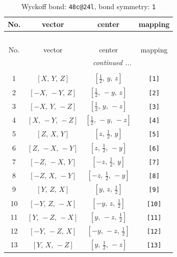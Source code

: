 \documentclass[fleqn,8pt]{jsarticle}
\begin{document}
\begin{longtable}{cccc}
\caption{Wyckoff bond: {\tt 48c@24l}, bond symmetry: {\tt 1}}
 \\
 \hline \hline
No. & vector & center & mapping \\ \hline \endfirsthead

\multicolumn{3}{l}{\tablename\ \thetable{}} \\
 \hline \hline
No. & vector & center & mapping \\ \hline \endhead

 \hline \hline
\multicolumn{3}{r}{\footnotesize\it continued ...} \\ \endfoot

 \hline \hline
\multicolumn{3}{r}{} \\ \endlastfoot

1 & $\left[ X,\, Y,\, Z \right]$ & $\left[ \frac{1}{2},\, y,\, z \right]$ & {\tt [1]} \\ \hline
2 & $\left[ - X,\, - Y,\, Z \right]$ & $\left[ \frac{1}{2},\, - y,\, z \right]$ & {\tt [2]} \\ \hline
3 & $\left[ - X,\, Y,\, - Z \right]$ & $\left[ \frac{1}{2},\, y,\, - z \right]$ & {\tt [3]} \\ \hline
4 & $\left[ X,\, - Y,\, - Z \right]$ & $\left[ \frac{1}{2},\, - y,\, - z \right]$ & {\tt [4]} \\ \hline
5 & $\left[ Z,\, X,\, Y \right]$ & $\left[ z,\, \frac{1}{2},\, y \right]$ & {\tt [5]} \\ \hline
6 & $\left[ Z,\, - X,\, - Y \right]$ & $\left[ z,\, \frac{1}{2},\, - y \right]$ & {\tt [6]} \\ \hline
7 & $\left[ - Z,\, - X,\, Y \right]$ & $\left[ - z,\, \frac{1}{2},\, y \right]$ & {\tt [7]} \\ \hline
8 & $\left[ - Z,\, X,\, - Y \right]$ & $\left[ - z,\, \frac{1}{2},\, - y \right]$ & {\tt [8]} \\ \hline
9 & $\left[ Y,\, Z,\, X \right]$ & $\left[ y,\, z,\, \frac{1}{2} \right]$ & {\tt [9]} \\ \hline
10 & $\left[ - Y,\, Z,\, - X \right]$ & $\left[ - y,\, z,\, \frac{1}{2} \right]$ & {\tt [10]} \\ \hline
11 & $\left[ Y,\, - Z,\, - X \right]$ & $\left[ y,\, - z,\, \frac{1}{2} \right]$ & {\tt [11]} \\ \hline
12 & $\left[ - Y,\, - Z,\, X \right]$ & $\left[ - y,\, - z,\, \frac{1}{2} \right]$ & {\tt [12]} \\ \hline
13 & $\left[ Y,\, X,\, - Z \right]$ & $\left[ y,\, \frac{1}{2},\, - z \right]$ & {\tt [13]} \\ \hline

\end{longtable}
\end{document}
